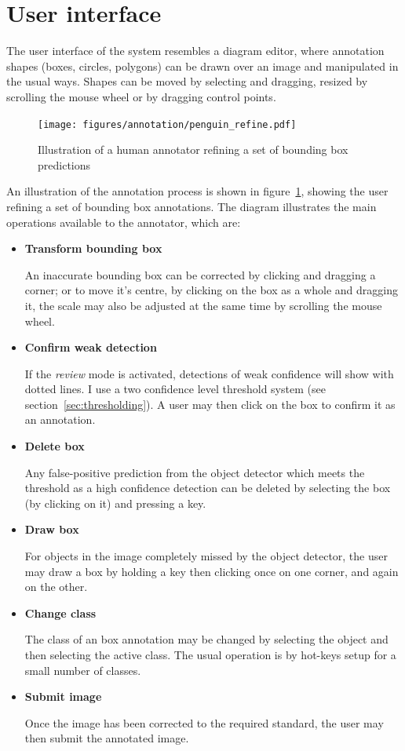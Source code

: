 \section {User interface}
\label{sec:user_interface}
 
The user interface of the system resembles a diagram editor, where annotation shapes (boxes, circles, polygons) can be drawn over an image and manipulated in the usual ways. Shapes can be moved by selecting and dragging, resized by scrolling the mouse wheel or by dragging control points. 

\begin{figure}[h!]
  \centering
  \texttt{[image: figures/annotation/penguin\_refine.pdf]}
  \caption{Illustration of a human annotator refining a set of bounding box predictions }   
  \label{fig:penguin_refinement}
\end{figure}

An illustration of the annotation process is shown in figure~\ref{fig:penguin_refinement}, showing the user refining a set of bounding box annotations. The diagram illustrates the main operations available to the annotator, which are:

\begin{itemize}
    \item {\bf Transform bounding box}\par
An inaccurate bounding box can be corrected by clicking and dragging a corner; or to move it's centre, by clicking on the box as a whole and dragging it, the scale may also be adjusted at the same time by scrolling the mouse wheel.
    \item {\bf Confirm weak detection}\par
If the \emph{review} mode is activated, detections of weak confidence will show with dotted lines. I use a two confidence level threshold system (see section~\ref{sec:thresholding}). A user may then click on the box to confirm it as an annotation.
    \item {\bf Delete box}\par
Any false-positive prediction from the object detector which meets the threshold as a high confidence detection can be deleted by selecting the box (by clicking on it) and pressing a key. 
    \item {\bf Draw box}\par
For objects in the image completely missed by the object detector, the user may draw a box by holding a key then clicking once on one corner, and again on the other.
    \item {\bf Change class}\par
The class of an box annotation may be changed by selecting the object and then selecting the active class. The usual operation is by hot-keys setup for a small number of classes.
    \item {\bf Submit image}\par
Once the image has been corrected to the required standard, the user may then submit the annotated image.
\end{itemize}

